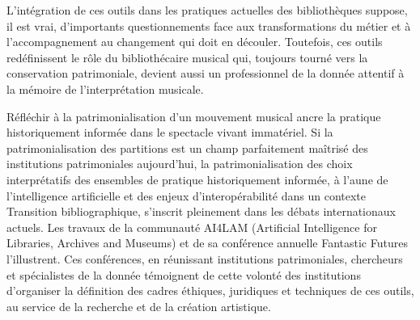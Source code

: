 L’intégration de ces outils dans les pratiques actuelles des bibliothèques suppose, il est vrai, d’importants questionnements face aux transformations du métier et à l’accompagnement au changement qui doit en découler. Toutefois, ces outils redéfinissent le rôle du bibliothécaire musical qui, toujours tourné vers la conservation patrimoniale, devient aussi un professionnel de la donnée attentif à la mémoire de l’interprétation musicale.

Réfléchir à la patrimonialisation d’un mouvement musical ancre la pratique historiquement informée dans le spectacle vivant immatériel. Si la patrimonialisation des partitions est un champ parfaitement maîtrisé des institutions patrimoniales aujourd’hui, la patrimonialisation des choix interprétatifs des ensembles de pratique historiquement informée, à l’aune de l’intelligence artificielle et des enjeux d'interopérabilité dans un contexte Transition bibliographique, s’inscrit pleinement dans les débats internationaux actuels. 
Les travaux de la communauté AI4LAM (Artificial Intelligence for Libraries, Archives and Museums)  et de sa conférence annuelle Fantastic Futures l’illustrent. 
Ces conférences, en réunissant institutions patrimoniales, chercheurs et spécialistes de la donnée témoignent de cette volonté des institutions d’organiser la définition des cadres éthiques, juridiques et techniques de ces outils, au service de la recherche et de la création artistique.
